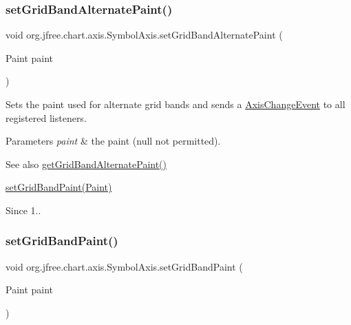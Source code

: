 \subsubsection{\texorpdfstring{set\+Grid\+Band\+Alternate\+Paint()}{setGridBandAlternatePaint()}}
{\footnotesize\ttfamily void org.\+jfree.\+chart.\+axis.\+Symbol\+Axis.\+set\+Grid\+Band\+Alternate\+Paint (\begin{DoxyParamCaption}\item[{Paint}]{paint }\end{DoxyParamCaption})}

Sets the paint used for alternate grid bands and sends a \mbox{\hyperlink{}{Axis\+Change\+Event}} to all registered listeners.


\begin{DoxyParams}{Parameters}
{\em paint} & the paint ({\ttfamily null} not permitted).\\
\hline
\end{DoxyParams}
\begin{DoxySeeAlso}{See also}
\mbox{\hyperlink{classorg_1_1jfree_1_1chart_1_1axis_1_1_symbol_axis_ab4690b0b0c3e3710d1a50a4ee950e40e}{get\+Grid\+Band\+Alternate\+Paint()}} 

\mbox{\hyperlink{classorg_1_1jfree_1_1chart_1_1axis_1_1_symbol_axis_af856b13e59d84b2df9ff838b0363a6d3}{set\+Grid\+Band\+Paint(\+Paint)}}
\end{DoxySeeAlso}
\begin{DoxySince}{Since}
1.. 
\end{DoxySince}
\mbox{\label{classorg_1_1jfree_1_1chart_1_1axis_1_1_symbol_axis_af856b13e59d84b2df9ff838b0363a6d3}} 
\subsubsection{\texorpdfstring{set\+Grid\+Band\+Paint()}{setGridBandPaint()}}
{\footnotesize\ttfamily void org.\+jfree.\+chart.\+axis.\+Symbol\+Axis.\+set\+Grid\+Band\+Paint (\begin{DoxyParamCaption}\item[{Paint}]{paint }\end{DoxyParamCaption})}

